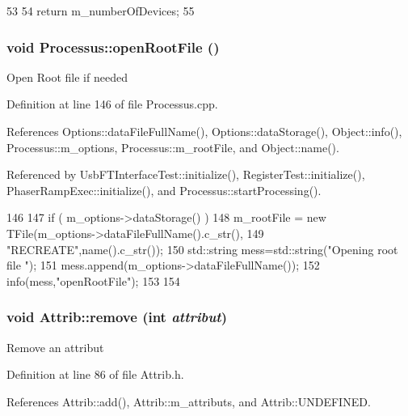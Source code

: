 \begin{DoxyCode}
53                        {
54     return m_numberOfDevices; 
55   } 
\end{DoxyCode}
\hypertarget{classProcessus_aacf6812880c1d1a2bf14a4a39458f443}{
\subsubsection[{openRootFile}]{\setlength{\rightskip}{0pt plus 5cm}void Processus::openRootFile ()}}
\label{classProcessus_aacf6812880c1d1a2bf14a4a39458f443}
Open Root file if needed 

Definition at line 146 of file Processus.cpp.

References Options::dataFileFullName(), Options::dataStorage(), Object::info(), Processus::m\_\-options, Processus::m\_\-rootFile, and Object::name().

Referenced by UsbFTInterfaceTest::initialize(), RegisterTest::initialize(), PhaserRampExec::initialize(), and Processus::startProcessing().


\begin{DoxyCode}
146                                {
147   if ( m_options->dataStorage() ){
148     m_rootFile = new TFile(m_options->dataFileFullName().c_str(),
149                            "RECREATE",name().c_str());
150         std::string mess=std::string("Opening root file ");
151         mess.append(m_options->dataFileFullName());
152         info(mess,"openRootFile");
153   }
154 }
\end{DoxyCode}
\hypertarget{classAttrib_a7d4ef7e32d93cb287792b87b857e79f3}{
\subsubsection[{remove}]{\setlength{\rightskip}{0pt plus 5cm}void Attrib::remove (int {\em attribut})}}
\label{classAttrib_a7d4ef7e32d93cb287792b87b857e79f3}
Remove an attribut 

Definition at line 86 of file Attrib.h.

References Attrib::add(), Attrib::m\_\-attributs, and Attrib::UNDEFINED.

